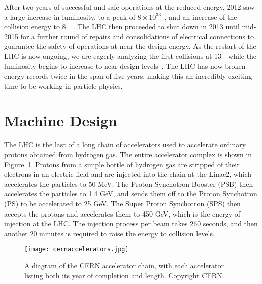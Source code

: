 After two years of successful and safe operations at the reduced energy, 2012 saw a large increase in luminosity, to a peak of $8\times10^{33}$~\lumirate, and an increase of the collision energy to 8~\TeV~\cite{LHCWeb}. The LHC then proceeded to shut down in 2013 until mid-2015 for a further round of repairs and consolidations of electrical connections to guarantee the safety of operations at near the design energy. As the restart of the LHC is now ongoing, we are eagerly analyzing the first collisions at 13~\TeV~while the luminosity begins to increase to near design levels~\cite{LHC15}. The LHC has now broken energy records twice in the span of five years, making this an incredibly exciting time to be working in particle physics.


\section{Machine Design}

The LHC is the last of a long chain of accelerators used to accelerate ordinary protons obtained from hydrogen gas\cite{cern-accelerators,LHC2008-2013}. The entire accelerator complex is shown in Figure~\ref{fig:lhc:cern-accelerators}. Protons from a simple bottle of hydrogen gas are stripped of their electrons in an electric field and are injected into the chain at the Linac2, which accelerates the particles to 50 MeV. The Proton Synchotron Booster (PSB) then accelerates the particles to 1.4 GeV, and sends them off to the Proton Synchotron (PS) to be accelerated to 25 GeV. The Super Proton Synchotron (SPS) then accepts the protons and accelerates them to 450 GeV, which is the energy of injection at the LHC. The injection process per beam takes 260 seconds, and then another 20 minutes is required to raise the energy to collision levels.


\begin{figure}
\centering
\texttt{[image: cernaccelerators.jpg]}
\caption{A diagram of the CERN accelerator chain, with each accelerator listing both its year of completion and length. Copyright CERN.}
\label{fig:lhc:cern-accelerators}
\end{figure}



